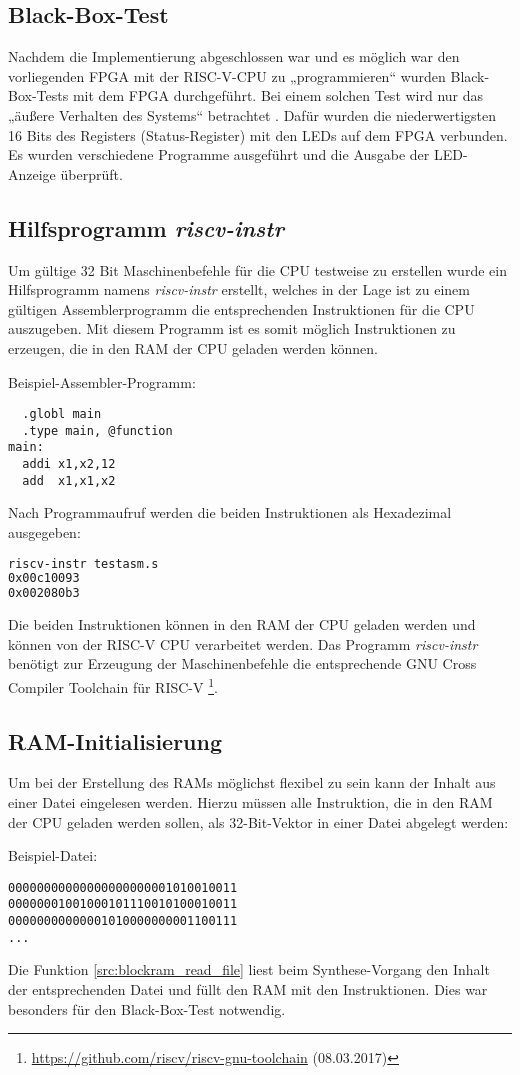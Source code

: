 \subsection{Black-Box-Test}
Nachdem die Implementierung abgeschlossen war und es möglich war den
vorliegenden FPGA mit der RISC-V-CPU zu „programmieren“ wurden
Black-Box-Tests mit dem FPGA durchgeführt. Bei einem solchen Test wird
nur das „äußere Verhalten des Systems“ betrachtet \cite[S. 311]{Kleuker}. Dafür wurden die niederwertigsten 16 Bits
des Registers  (Status-Register) mit den LEDs auf dem FPGA verbunden. Es
wurden verschiedene Programme ausgeführt und die Ausgabe der LED-Anzeige
überprüft.

\subsection{Hilfsprogramm \emph{riscv-instr}}
Um gültige 32 Bit Maschinenbefehle für die CPU testweise zu erstellen
wurde ein Hilfsprogramm namens \emph{riscv-instr} erstellt, welches in
der Lage ist zu einem gültigen Assemblerprogramm die entsprechenden
Instruktionen für die CPU auszugeben. Mit diesem Programm ist es somit
möglich Instruktionen zu erzeugen, die in den RAM der CPU geladen werden
können.

Beispiel-Assembler-Programm:
\begin{lstlisting}
  .globl main
  .type main, @function
main:
  addi x1,x2,12 
  add  x1,x1,x2
\end{lstlisting}

Nach Programmaufruf werden die beiden Instruktionen als Hexadezimal
ausgegeben:
\begin{lstlisting}[language=bash]
riscv-instr testasm.s
0x00c10093 
0x002080b3 
\end{lstlisting}
Die beiden Instruktionen können in den RAM der CPU geladen werden und
können von der RISC-V CPU verarbeitet werden. Das Programm
\emph{riscv-instr} benötigt zur Erzeugung der Maschinenbefehle die 
entsprechende GNU Cross Compiler Toolchain für RISC-V
\footnote{\url{https://github.com/riscv/riscv-gnu-toolchain}
(08.03.2017)}. 

\subsection{RAM-Initialisierung}
Um bei der Erstellung des RAMs möglichst flexibel zu sein kann der
Inhalt aus einer Datei eingelesen werden. \cite[S. 187]{XST}
Hierzu müssen alle Instruktion, die in den RAM der CPU geladen werden
sollen, als 32-Bit-Vektor in einer Datei abgelegt werden:

Beispiel-Datei:
\begin{lstlisting}
00000000000000000000001010010011
00000001001000101110010100010011
00000000000001010000000001100111
...
\end{lstlisting}

Die Funktion \ref{src:blockram_read_file} liest beim Synthese-Vorgang
den Inhalt der entsprechenden Datei und füllt den RAM mit den
Instruktionen. Dies war besonders für den Black-Box-Test notwendig.
